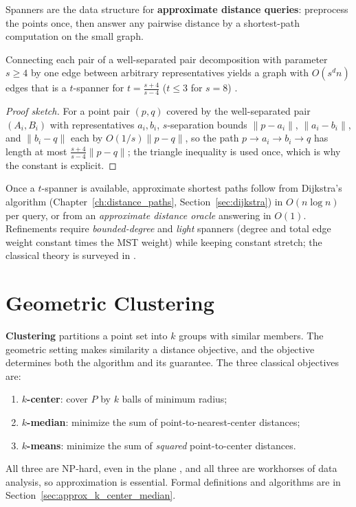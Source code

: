 Spanners are the data structure for \textbf{approximate distance
queries}: preprocess the points once, then answer any
pairwise distance by a shortest-path computation on the small graph.

\begin{theorem}\label{thm:approx_spanner_stretch}
  Connecting each pair of a well-separated pair decomposition with parameter
  $s \geq 4$ by one edge between arbitrary representatives yields a graph
  with $O(s^d n)$ edges that is a $t$-spanner for
  $t = \frac{s + 4}{s - 4}$ ($t \leq 3$ for $s = 8$)
  \cite{callahan1995,harpeled2011}.
\end{theorem}

\begin{proof}[Proof sketch]
  For a point pair $(p, q)$ covered by the well-separated pair
  $(A_i, B_i)$ with representatives $a_i, b_i$, $s$-separation bounds
  $\|p - a_i\|$, $\|a_i - b_i\|$, and $\|b_i - q\|$ each by $O(1/s)\|p - q\|$,
  so the path $p \to a_i \to b_i \to q$ has length at most
  $\frac{s+4}{s-4}\|p - q\|$; the triangle inequality is used once, which is
  why the constant is explicit.
\end{proof}

Once a $t$-spanner is available, approximate shortest paths follow from
Dijkstra's algorithm (Chapter~\ref{ch:distance_paths},
Section~\ref{sec:dijkstra}) in $O(n \log n)$ per query, or from an
\emph{approximate distance oracle} answering in $O(1)$. Refinements require
\emph{bounded-degree} and \emph{light} spanners (degree and total edge
weight constant times the MST weight) while keeping constant stretch; the
classical theory is surveyed in \cite{harpeled2011}.


\section{Geometric Clustering}
\label{sec:approx_clustering}

\textbf{Clustering} partitions a point set into $k$
groups with similar members. The geometric setting makes similarity a
distance objective, and the objective determines both the algorithm and its
guarantee. The three classical objectives are:
\begin{enumerate}
  \item \textbf{$k$-center}: cover $P$ by $k$ balls of minimum radius;
  \item \textbf{$k$-median}: minimize the sum of point-to-nearest-center
    distances;
  \item \textbf{$k$-means}: minimize the sum of \emph{squared}
    point-to-center distances.
\end{enumerate}
All three are NP-hard, even in the plane \cite{gonzalez1985}, and all three
are workhorses of data analysis, so approximation is essential. Formal
definitions and algorithms are in Section~\ref{sec:approx_k_center_median}.

